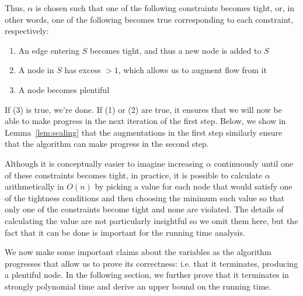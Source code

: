 \documentclass[11pt]{article}
\theoremstyle{definition}
\theoremstyle{definition}
\begin{document}
		Thus, $\alpha$ is chosen such that one of the following constraints becomes
		tight, or, in other words, one of the following becomes true corresponding to
		each constraint, respectively:
		\begin{enumerate}[itemsep=-1mm]
			\item An edge entering $S$ becomes tight, and thus a new node is added to $S$
			\item A node in $S$ has excess $>1$, which allows us to augment flow from it
			\item A node becomes plentiful
		\end{enumerate}
		
		If (3) is true, we're done. If (1) or (2) are true, it ensures that we will now
		be able to make progress in the next iteration of the first step. Below, we show
		in Lemma~\ref{lem:scaling} that the augmentations in the first step similarly ensure
		that the algorithm can make progress in the second step. 
		
		Although it is conceptually easier to imagine increasing $\alpha$ continuously
		until one of these constraints becomes tight, in practice, it is possible to
		calculate $\alpha$ arithmetically in $O(n)$ by picking a value for each node
		that would satisfy one of the tightness conditions and then choosing the minimum
		such value so that only one of the constraints become tight and none are
		violated.
		The details of calculating the value are not particularly insightful so we omit them here, but the
		fact that it can be done is important for the running time analysis.
		
		We now make some important claims about the variables as the algorithm
		progresses that allow us to prove its correctness: i.e. that it terminates,
		producing a plentiful node.
		In the following section,
		we further prove that it terminates in strongly polynomial time and derive
		an upper bound on the running time.
		
\end{document}
